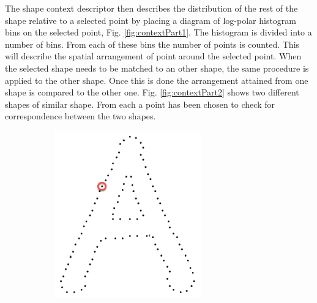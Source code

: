 The shape context descriptor then describes the distribution of the rest of the shape relative to a selected point by placing a diagram of log-polar histogram bins on the selected point, Fig. \ref{fig:contextPart1}. The histogram is divided into a number of bins. From each of these bins the number of points is counted. This will describe the spatial arrangement of point around the selected point. When the selected shape needs to be matched to an other shape, the same procedure is applied to the other shape. Once this is done the arrangement attained from one shape is compared to the other one. Fig. \ref{fig:contextPart2} shows two different shapes of similar shape. From each a point has been chosen to check for correspondence between the two shapes.\\ 

\begin{figure}[h]
        \centering
        \begin{subfigure}[b]{0.36\textwidth}
                \centering
                \includegraphics[width=0.7\textwidth]{figures/LitreatureReview/lettera.png}
                \caption{}
                \label{fig:lettA}
        \end{subfigure}
        \begin{subfigure}[b]{0.36\textwidth}
                \centering

\end{subfigure}
\end{figure}
